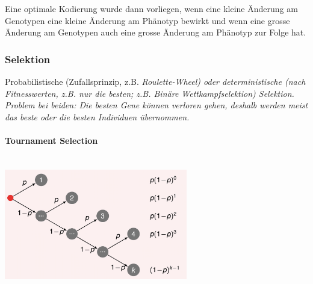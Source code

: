   	Eine optimale Kodierung wurde dann vorliegen, wenn eine kleine Änderung am Genotypen eine kleine Änderung am Phänotyp bewirkt und wenn eine grosse Änderung am Genotypen auch eine grosse Änderung am Phänotyp zur Folge hat.

\subsubsection{Selektion }
  Probabilistische (Zufallsprinzip, z.B. \em Roulette-Wheel\em ) oder deterministische (nach Fitnesswerten, z.B. nur die besten; z.B. \em Binäre Wettkampfselektion\em ) Selektion. Problem bei beiden: Die besten Gene können verloren gehen, deshalb werden meist das beste oder die besten Individuen übernommen.
  
  \paragraph{Tournament Selection}\mbox{}\\
  \includegraphics[width=8cm]{./Content/MetaHeuristics/tournament_selection}


  
